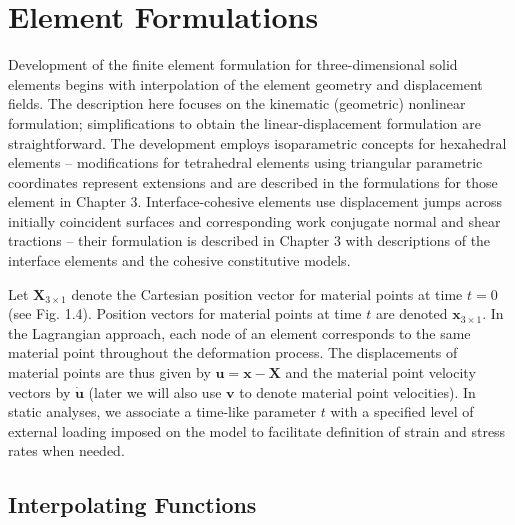 \documentclass[11pt]{report}
\numberwithin{equation}{section}
\newcommand{\bmf } {\boldsymbol }  %
\newcommand{\nid}{\noindent}
\begin{document}
\section{Element Formulations}
\nid 
Development of the finite element formulation for three-dimensional solid elements
begins with interpolation of the element geometry and displacement fields. The description
here focuses on the kinematic (geometric) nonlinear formulation; simplifications to
obtain the linear-displacement formulation are straightforward.  The development employs
isoparametric concepts for hexahedral elements -- modifications for tetrahedral elements using
triangular parametric coordinates represent extensions and are described in the formulations
for those element in Chapter 3. Interface-cohesive elements 
use displacement
jumps across initially coincident surfaces and
corresponding work conjugate normal and shear tractions -- their formulation is
described in Chapter 3 with descriptions of the interface elements and the cohesive
constitutive models.

Let $\bmf{X}_{3\times 1}$ denote the Cartesian position vector for material points at
time $t=0$ (see Fig. 1.4).  Position vectors for material points at time $t$ are denoted 
$\bmf{x}_{3\times 1}$. In the Lagrangian approach, each node of an element corresponds
to the same material point throughout the deformation process. The displacements of material
points are thus given by $\bmf{u} = \bmf{x}-\bmf{X}$ and the material point
velocity vectors by $\dot{\bmf{u}}$ (later we will also use $\bmf{v}$ to denote material point
velocities). In static analyses, we associate a time-like parameter $t$ 
with a specified level of external loading imposed on the model to facilitate definition
of strain and stress rates when needed.

\subsection{Interpolating Functions}
\end{document}
